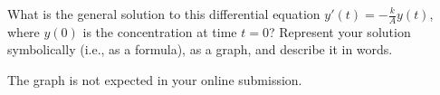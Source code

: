 \documentclass{ximera}
\begin{document}
\begin{question}
What is the general solution to this differential equation $y'(t)=-\frac{k}{A}y(t)$, where $y(0)$ is the concentration at time $t=0$? 
 Represent your solution symbolically (i.e., as a formula), as a graph, and describe it in words.   
\begin{prompt}
The graph is not expected in your online submission.  
\end{prompt}
\begin{freeResponse}
\end{freeResponse}
\end{question}

\end{document}

